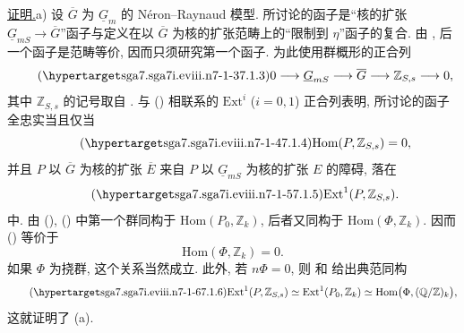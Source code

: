 \medskip
\noindent\underline{证明.}\quad a) 设 $\overline G$ 为 $\underline G_m$ 的 N\'eron--Raynaud 模型. 所讨论的函子是“核的扩张 $\underline G_{mS}\to\overline G$”函子与定义在以 $\overline G$ 为核的扩张范畴上的“限制到 $\eta$”函子的复合. 由 , 后一个函子是范畴等价, 因而只须研究第一个函子. 为此使用群概形的正合列
\begin{equation}\tag{\SGARefTarget{sga7.sga7i.eviii.n7-1-3}{7.1.3}}
 0\longrightarrow\underline G_{mS}\longrightarrow\overline G
 \longrightarrow\mathbb Z_{S,s}\longrightarrow0,
\end{equation}
其中 $\mathbb Z_{S,s}$ 的记号取自 . 与 () 相联系的 $\mathrm{Ext}^i$ ($i=0,1$) 正合列表明, 所讨论的函子全忠实当且仅当
\begin{equation}\tag{\SGARefTarget{sga7.sga7i.eviii.n7-1-4}{7.1.4}}
 \mathrm{Hom}(P,\mathbb Z_{S,s})=0,
\end{equation}
并且 $P$ 以 $\overline G$ 为核的扩张 $\overline E$ 来自 $P$ 以 $\underline G_{mS}$ 为核的扩张 $E$ 的障碍, 落在
\begin{equation}\tag{\SGARefTarget{sga7.sga7i.eviii.n7-1-5}{7.1.5}}
 \mathrm{Ext}^1(P,\mathbb Z_{S,s}).
\end{equation}
中. 由 (), () 中第一个群同构于 $\mathrm{Hom}(P_0,\mathbb Z_k)$, 后者又同构于 $\mathrm{Hom}(\Phi,\mathbb Z_k)$. 因而 () 等价于
\begin{equation}\tag{7.1.4 bis}
 \mathrm{Hom}(\Phi,\mathbb Z_k)=0.
\end{equation}
如果 $\Phi$ 为挠群, 这个关系当然成立. 此外, 若 $n\Phi=0$, 则  和  给出典范同构
\begin{equation}\tag{\SGARefTarget{sga7.sga7i.eviii.n7-1-6}{7.1.6}}
 \mathrm{Ext}^1(P,\mathbb Z_{S,s})
 \simeq\mathrm{Ext}^1(P_0,\mathbb Z_k)
 \simeq\mathrm{Hom}\bigl(\Phi,(\mathbb Q/\mathbb Z)_k\bigr),
\end{equation}
这就证明了 (a).

